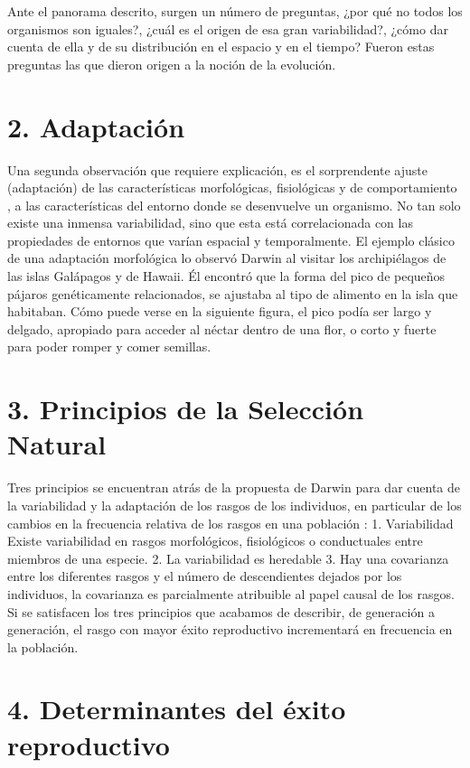 \documentclass[
  letterpaper,
]{book}
\begin{document}
Ante el panorama descrito, surgen un número de preguntas, ¿por qué no
todos los organismos son iguales?, ¿cuál es el origen de esa gran
variabilidad?, ¿cómo dar cuenta de ella y de su distribución en el
espacio y en el tiempo? Fueron estas preguntas las que dieron origen a
la noción de la evolución.

\section{2. Adaptación}\label{adaptaciuxf3n}

Una segunda observación que requiere explicación, es el sorprendente
ajuste (adaptación) de las características morfológicas, fisiológicas y
de comportamiento , a las características del entorno donde se
desenvuelve un organismo. No tan solo existe una inmensa variabilidad,
sino que esta está correlacionada con las propiedades de entornos que
varían espacial y temporalmente. El ejemplo clásico de una adaptación
morfológica lo observó Darwin al visitar los archipiélagos de las islas
Galápagos y de Hawaii. Él encontró que la forma del pico de pequeños
pájaros genéticamente relacionados, se ajustaba al tipo de alimento en
la isla que habitaban. Cómo puede verse en la siguiente figura, el pico
podía ser largo y delgado, apropiado para acceder al néctar dentro de
una flor, o corto y fuerte para poder romper y comer semillas.

\section{3. Principios de la Selección
Natural}\label{principios-de-la-selecciuxf3n-natural-1}

Tres principios se encuentran atrás de la propuesta de Darwin para dar
cuenta de la variabilidad y la adaptación de los rasgos de los
individuos, en particular de los cambios en la frecuencia relativa de
los rasgos en una población : 1. Variabilidad Existe variabilidad en
rasgos morfológicos, fisiológicos o conductuales entre miembros de una
especie. 2. La variabilidad es heredable 3. Hay una covarianza entre los
diferentes rasgos y el número de descendientes dejados por los
individuos, la covarianza es parcialmente atribuible al papel causal de
los rasgos. Si se satisfacen los tres principios que acabamos de
describir, de generación a generación, el rasgo con mayor éxito
reproductivo incrementará en frecuencia en la población.

\section{4. Determinantes del éxito
reproductivo}\label{determinantes-del-uxe9xito-reproductivo}
\end{document}
